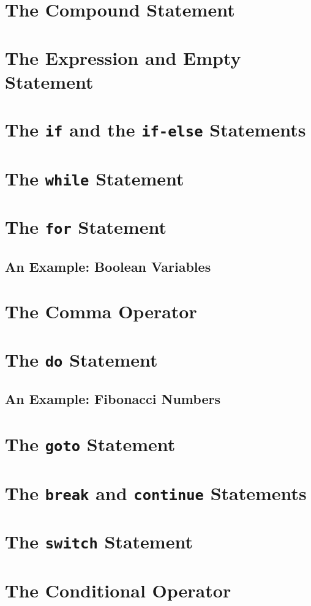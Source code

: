 \documentclass[12pt]{book}
\begin{document}
\section{The Compound Statement}
\section{The Expression and Empty Statement}
\section{The \texttt{if} and the \texttt{if-else} Statements}
\section{The \texttt{while} Statement}
\section{The \texttt{for} Statement}
\subsection{An Example: Boolean Variables}
\section{The Comma Operator}
\section{The \texttt{do} Statement}
\subsection{An Example: Fibonacci Numbers}
\section{The \texttt{goto} Statement}
\section{The \texttt{break} and \texttt{continue} Statements}
\section{The \texttt{switch} Statement}
\section{The Conditional Operator}
\end{document}
